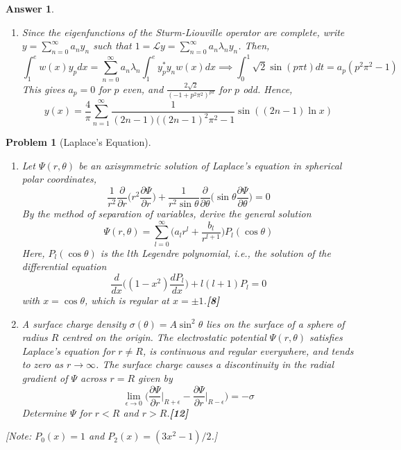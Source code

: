\documentclass[a4paper]{article}
\newtheorem{ans}{Answer}[section]
\theoremstyle{new}
\newtheorem{qns}{Problem}[section]
\begin{document}
\begin{ans}
\begin{enumerate}[label=(\roman*)]
\begin{enumerate}[label=(\alph*)]
$$1=\langle y|y\rangle_w=\int_1^e|y|^2\frac{1}{x}dx=|A|^2\int_0^1\sin^2(n\pi t)dt=\frac{1}{2}|A|^2\implies y_n(x)=\sqrt{2}\sin(n\pi \ln x)$$
\item Since the eigenfunctions of the Sturm-Liouville operator are complete, write $y=\sum_{n=0}^\infty a_ny_n$ such that $1=\mathcal{L}y=\sum_{n=0}^\infty a_n\lambda_ny_n$. Then,
$$\int_1^ew(x)y_pdx=\sum_{n=0}^\infty a_n\lambda_n\int_1^ey_p^*y_nw(x)dx\implies\int_0^1\sqrt{2}\sin(p\pi t)dt=a_p(p^2\pi^2-1)$$
This gives $a_p=0$ for $p$ even, and $\frac{2\sqrt{2}}{(-1+p^2\pi^2)^{p\pi}}$ for $p$ odd. Hence,
$$y(x)=\frac{4}{\pi}\sum_{n=1}^\infty\frac{1}{(2n-1)((2n-1)^2\pi^2-1}\sin((2n-1)\ln x)$$
\end{enumerate}
\end{enumerate}
\end{ans}
\begin{qns}[Laplace's Equation]\leavevmode
\begin{enumerate}[label=(\roman*)]
\item Let $\Psi(r,\theta)$ be an axisymmetric solution of Laplace’s equation in spherical polar coordinates,
$$\frac{1}{r^2}\frac{\partial}{\partial r}\bigg(r^2\frac{\partial\Psi}{\partial r}\bigg)+\frac{1}{r^2\sin\theta}\frac{\partial}{\partial\theta}\bigg(\sin\theta\frac{\partial\Psi}{\partial\theta}\bigg)=0$$
By the method of separation of variables, derive the general solution
$$\Psi(r,\theta)=\sum_{l=0}^\infty\bigg(a_lr^l+\frac{b_l}{r^{l+1}}\bigg)P_l(\cos\theta)$$
Here, $P_l(\cos\theta)$ is the $l$th Legendre polynomial, i.e., the solution of the differential equation
$$\frac{d}{dx}\bigg((1-x^2)\frac{dP_l}{dx}\bigg)+l(l+1)P_l=0$$
with $x=\cos\theta$, which is regular at $x =\pm 1$.\hfill\textbf{[8]}
\item A surface charge density $\sigma(\theta)=A\sin^2\theta$ lies on the surface of a sphere of radius $R$ centred on the origin. The electrostatic potential $\Psi(r,\theta)$ satisfies Laplace’s equation for $r\neq R$, is continuous and regular everywhere, and tends to zero as $r\rightarrow\infty$. The surface charge causes a discontinuity in the radial gradient of $\Psi$ across $r = R$ given by
$$\lim_{\epsilon\rightarrow0}\bigg(\frac{\partial\Psi}{\partial r}\bigg|_{R+\epsilon}-\frac{\partial\Psi}{\partial r}\bigg|_{R-\epsilon}\bigg)=-\sigma$$
Determine $\Psi$ for $r < R$ and $r > R$.\hfill\textbf{[12]}
\end{enumerate}
[Note: $P_0(x) = 1$ and $P_2(x) = (3x^2 − 1)/2$.]
\end{qns}
\newpage
\end{document}

